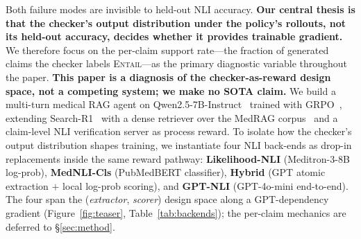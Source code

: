 \documentclass[11pt]{article}
\begin{document}
Both failure modes are invisible to held-out NLI 
accuracy. \textbf{Our central thesis is that the 
checker's output distribution under the policy's 
rollouts, not its held-out accuracy, decides whether 
it provides trainable gradient.} We therefore focus 
on the per-claim support rate---the fraction of 
generated claims the checker labels 
\textsc{Entail}---as the primary diagnostic variable 
throughout the paper.
\textbf{This paper is a diagnosis of the 
checker-as-reward design space, not a competing 
system; we make no SOTA claim.} We build a multi-turn medical RAG agent on Qwen2.5-7B-Instruct~\citep{hui2024qwen2} trained with GRPO~\citep{shao2024deepseekmath}, extending Search-R1~\citep{jin2025search} with a dense retriever over the MedRAG corpus~\citep{xiong2024benchmarking} and a claim-level NLI verification server as process reward.
To isolate how the checker's output distribution 
shapes training, we instantiate four NLI back-ends 
as drop-in replacements inside the same reward 
pathway: \textbf{Likelihood-NLI} (Meditron-3-8B 
log-prob), \textbf{MedNLI-Cls} (PubMedBERT 
classifier), \textbf{Hybrid} (GPT atomic extraction 
$+$ local log-prob scoring), and \textbf{GPT-NLI} 
(GPT-4o-mini end-to-end). The four span the 
(\emph{extractor}, \emph{scorer}) design space along 
a GPT-dependency gradient 
(Figure~\ref{fig:teaser}, Table~\ref{tab:backends}); 
the per-claim mechanics are deferred to 
\S\ref{sec:method}.
\end{document}
